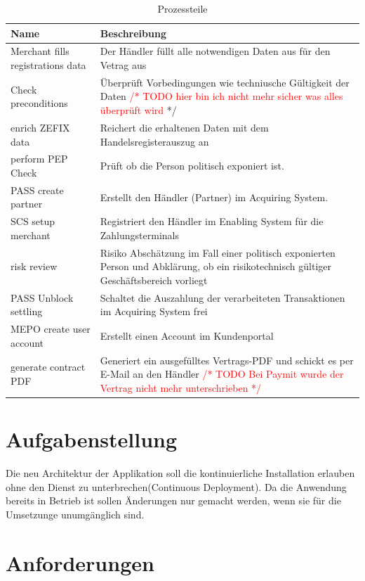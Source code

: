 \begin{table}[H]
	\centering
	\caption{Prozessteile}
	\begin{tabular}{ | p{4cm} | p{11cm} | }
		\toprule
		{\textbf{Name}} & {\textbf{Beschreibung}} \\
		\midrule
		Merchant fills registrations data & Der Händler füllt alle notwendigen Daten aus für den Vetrag aus \\ \hline
		Check preconditions & Überprüft Vorbedingungen wie techniusche Gültigkeit der Daten \textcolor{red}{/* TODO  hier bin ich nicht mehr sicher was alles überprüft wird} */ \\ \hline
		enrich ZEFIX data & Reichert die erhaltenen Daten mit dem Handelsregisterauszug an \\ \hline
		perform PEP Check & Prüft ob die Person politisch exponiert ist. \\ \hline
		PASS create partner & Erstellt den Händler (Partner) im Acquiring System.\\ \hline
		SCS setup merchant & Registriert den Händler im Enabling System für die Zahlungsterminals \\ \hline
		risk review  & Risiko Abschätzung im Fall einer politisch exponierten Person und Abklärung, ob ein risikotechnisch gültiger Geschäftsbereich vorliegt \\ \hline
	    PASS Unblock settling & Schaltet die Auszahlung der verarbeiteten Transaktionen im Acquiring System frei \\ \hline
	    MEPO create user account&  Erstellt einen Account im Kundenportal \\ \hline
	    generate contract PDF & Generiert ein ausgefülltes Vertrags-PDF und schickt es per E-Mail an den Händler \textcolor{red}{/* TODO Bei Paymit wurde der Vertrag nicht mehr unterschrieben */}  \\
		\bottomrule
	\end{tabular}
\end{table}

\section{Aufgabenstellung}

Die neu Architektur der Applikation soll die kontinuierliche Installation erlauben ohne den Dienst zu unterbrechen(Continuous Deployment). Da die Anwendung bereits in Betrieb ist sollen Änderungen nur gemacht werden, wenn sie für die Umsetzunge unumgänglich sind. 

\section{Anforderungen}

